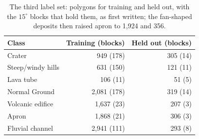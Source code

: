 \documentclass[twocolumn]{aastex701}
\begin{document}
\begin{table}[t]
\centering
\caption{The third label set: polygons for training and held out, with the $15^{\circ}$ blocks that hold them, as
first written; the fan-shaped deposits then raised apron to 1,924 and 356. \label{tab:rules}}
\small
\begin{tabular}{lrr}
\hline\hline
Class & Training (blocks) & Held out (blocks) \\
\hline
Crater & 949 (178) & 305 (14) \\
Steep/windy hills & 631 (150) & 121 (11) \\
Lava tube & 106 (11) & 51 (5) \\
Normal Ground & 2,081 (178) & 319 (14) \\
Volcanic edifice & 1,637 (23) & 207 (3) \\
Apron & 1,868 (21) & 306 (3) \\
Fluvial channel & 2,941 (111) & 293 (8) \\
\hline
\end{tabular}
\end{table}
\end{document}
